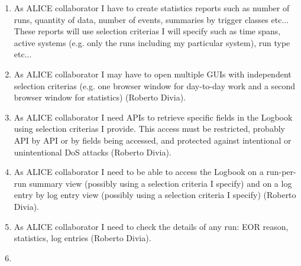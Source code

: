 \documentclass[a4paper,11pt]{book}
\begin{document}
\begin{enumerate}
  \item As ALICE collaborator I have to create statistics reports such as number of runs, quantity of data, number of events, summaries by trigger classes etc... These reports will use selection criterias I will specify such as time spans, active systems (e.g. only the runs including my particular system), run type etc...
\item As ALICE collaborator I may have to open multiple GUIs with independent selection criterias (e.g. one browser window for day-to-day work and a second browser window for statistics) (Roberto Divia).
\item As ALICE collaborator I need APIs to retrieve specific fields in the Logbook using selection criterias I provide. This access must be restricted, probably API by API or by fields being accessed, and protected against intentional or unintentional DoS attacks (Roberto Divia).
\item As ALICE collaborator I need to be able to access the Logbook on a run-per-run summary view (possibly using a selection criteria I specify) and on a log entry by log entry view (possibly using a selection criteria I specify) (Roberto Divia).
\item As ALICE collaborator I need to check the details of any run: EOR reason, statistics, log entries (Roberto Divia).

  \item 
\end{enumerate}
\end{document}
